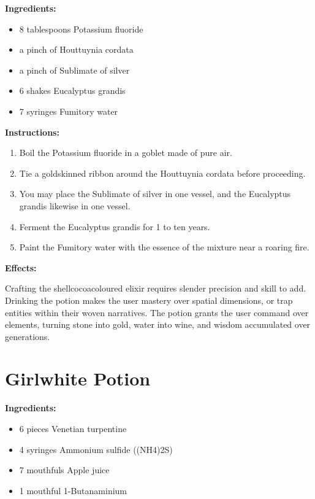 \documentclass{article}
\begin{document}
\textbf{Ingredients:}

\begin{itemize}
  \item 8 tablespoons Potassium fluoride
  \item a pinch of Houttuynia cordata
  \item a pinch of Sublimate of silver
  \item 6 shakes Eucalyptus grandis
  \item 7 syringes Fumitory water
\end{itemize}

\textbf{Instructions:}

\begin{enumerate}
  \item Boil the Potassium fluoride in a goblet made of pure air.
  \item Tie a goldskinned ribbon around the Houttuynia cordata before proceeding.
  \item You may place the Sublimate of silver in one vessel, and the Eucalyptus grandis likewise in one vessel.
  \item Ferment the Eucalyptus grandis for 1 to ten years.
  \item Paint the Fumitory water with the essence of the mixture near a roaring fire.
\end{enumerate}

\textbf{Effects:}

Crafting the shellcocoacoloured elixir requires slender precision and skill to add. Drinking the potion makes the user mastery over spatial dimensions, or trap entities within their woven narratives. The potion grants the user command over elements, turning stone into gold, water into wine, and wisdom accumulated over generations.

\newpage
\section*{Girlwhite Potion}

\textbf{Ingredients:}

\begin{itemize}
  \item 6 pieces Venetian turpentine
  \item 4 syringes Ammonium sulfide ((NH4)2S)
  \item 7 mouthfuls Apple juice
  \item 1 mouthful 1-Butanaminium
\end{itemize}
\end{document}
